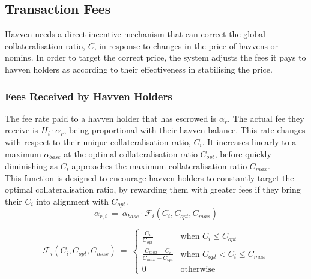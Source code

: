 \newpage
\subsection{Transaction Fees}
Havven needs a direct incentive mechanism that can correct the global
collateralisation ratio, $C$, in response to changes in the price of havvens
or nomins. In order to target the correct price, the system adjusts the fees
it pays to havven holders as according to their effectiveness in stabilising
the price.

\subsubsection{Fees Received by Havven Holders}

\noindent The fee rate paid to a havven holder that has escrowed is
$\alpha_r$. The actual fee they receive is $H_i \cdot \alpha_r$, being
proportional with their havven balance. This rate changes with respect to
their unique collateralisation ratio, $C_i$. It increases linearly to a
maximum $\alpha_{base}$ at the optimal collateralisation ratio $C_{opt}$,
before quickly diminishing as $C_i$ approaches the maximum collateralisation
ratio $C_{max}$. \\

\noindent This function is designed to encourage havven holders to constantly
target the optimal collateralisation ratio, by rewarding them with greater
fees if they bring their $C_i$ into alignment with $C_{opt}$.\\

\begin{equation}
\alpha_{r,i} \ = \ \alpha_{base} \cdot \mathcal{F}_{i}(C_{i}, C_{opt}, C_{max})  \label{eq:feesreceived}
\end{equation}

\begin{equation}
\mathcal{F}_{i}(C_{i}, C_{opt}, C_{max}) \ = \
\begin{cases}
 \frac{C_{i}}{C_{opt}} &\mbox{when } C_{i} \leq C_{opt} \\[1em]
 \frac{C_{max} - C_{i}}{C_{max} - C_{opt}} &\mbox{when } C_{opt} < C_{i} \leq C_{max} \\[1em]
 0 &\mbox{otherwise}
 \end{cases}
 \label{eq:7}
\end{equation}

\begin{center}
\end{center}

